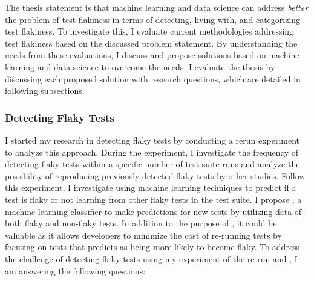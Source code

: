The thesis statement is that machine learning and data science can address \emph{better} the problem of test flakiness in terms of detecting, living with, and categorizing test flakiness. To investigate this, I evaluate current methodologies addressing test flakiness based on the discussed problem statement. By understanding the needs from these evaluations, I discuss and propose solutions based on machine learning and data science to overcome the needs. I evaluate the thesis by discussing each proposed solution with research questions, which are detailed in following subsections.


\subsubsection{Detecting Flaky Tests}

I started my research in detecting flaky tests by conducting a rerun experiment to analyze this approach. During the experiment, I investigate the frequency of detecting flaky tests within a specific number of test suite runs and analyze the possibility of reproducing previously detected flaky tests by other studies.
Follow this experiment, I investigate using machine learning techniques to predict if a test is flaky or not learning from other flaky tests in the test suite. I propose \sysName, a machine learning classifier to make predictions for new tests by utilizing data of both flaky and non-flaky tests. In addition to the purpose of \sysName, it could be valuable as it allows developers to minimize the cost of re-running tests by focusing on tests that \sysName predicts as being more likely to become flaky. 
To address the challenge of detecting flaky tests using my experiment of the re-run and \sysName, I am answering the following questions:



